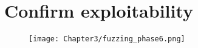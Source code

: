 \section{Confirm exploitability}

\begin{figure}[H]
    \centering
    \texttt{[image: Chapter3/fuzzing\_phase6.png]}
\end{figure}